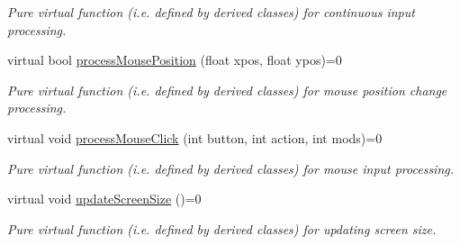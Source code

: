 \begin{DoxyCompactItemize}
\begin{DoxyCompactList}\small\item\em Pure virtual function (i.\+e. defined by derived classes) for continuous input processing. \end{DoxyCompactList}\item 
virtual bool \hyperlink{class_environment_a92819bf5a6aa5877c0f89fd65a4d7554}{process\+Mouse\+Position} (float xpos, float ypos)=0
\begin{DoxyCompactList}\small\item\em Pure virtual function (i.\+e. defined by derived classes) for mouse position change processing. \end{DoxyCompactList}\item 
virtual void \hyperlink{class_environment_a19cf4bbbe86528759e0ad79e19025732}{process\+Mouse\+Click} (int button, int action, int mods)=0
\begin{DoxyCompactList}\small\item\em Pure virtual function (i.\+e. defined by derived classes) for mouse input processing. \end{DoxyCompactList}\item 
virtual void \hyperlink{class_environment_abb73916469b534c1cef1691ef61cd4ca}{update\+Screen\+Size} ()=0\hypertarget{class_environment_abb73916469b534c1cef1691ef61cd4ca}{}\label{class_environment_abb73916469b534c1cef1691ef61cd4ca}

\begin{DoxyCompactList}\small\item\em Pure virtual function (i.\+e. defined by derived classes) for updating screen size. \end{DoxyCompactList}\end{DoxyCompactItemize}
